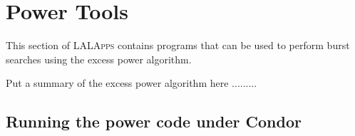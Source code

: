 \section{Power Tools}
\label{section:powertools}

This section of \textsc{LALApps} contains programs that can be used to
perform burst searches using the excess power algorithm.   

Put a summary of the excess power algorithm here .........

\clearpage


\subsection{Running the power code under Condor}
\label{subsection:running_power}

